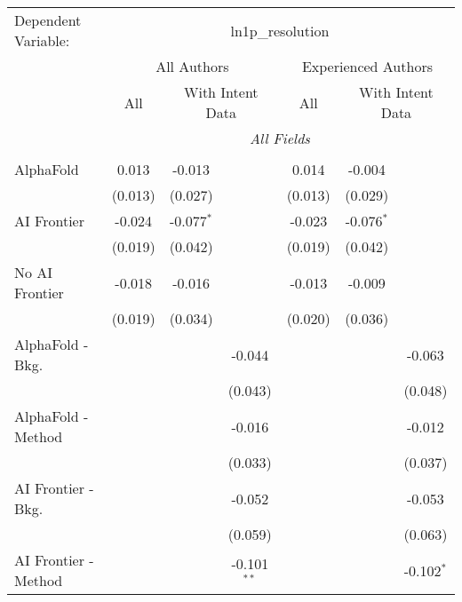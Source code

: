 \begingroup
\centering
\begin{tabular}{lcccccc}
   \tabularnewline \midrule \midrule
   Dependent Variable: & \multicolumn{6}{c}{ln1p\_resolution}\\
 & \multicolumn{3}{c}{All Authors} & \multicolumn{3}{c}{Experienced Authors} \\
\cmidrule(lr){2-4} \cmidrule(lr){5-7}
 & \multicolumn{1}{c}{All} & \multicolumn{2}{c}{With Intent Data} & \multicolumn{1}{c}{All} & \multicolumn{2}{c}{With Intent Data} \\
\cmidrule(lr){2-2} \cmidrule(lr){3-4} \cmidrule(lr){5-5} \cmidrule(lr){6-7}
 & \multicolumn{6}{c}{\textit{All Fields}} \\ \\
   AlphaFold               & 0.013   & -0.013       &               & 0.014   & -0.004       &   \\   
                           & (0.013) & (0.027)      &               & (0.013) & (0.029)      &   \\   
   AI Frontier             & -0.024  & -0.077$^{*}$ &               & -0.023  & -0.076$^{*}$ &   \\   
                           & (0.019) & (0.042)      &               & (0.019) & (0.042)      &   \\   
   No AI Frontier          & -0.018  & -0.016       &               & -0.013  & -0.009       &   \\   
                           & (0.019) & (0.034)      &               & (0.020) & (0.036)      &   \\   
   AlphaFold - Bkg.        &         &              & -0.044        &         &              & -0.063\\   
                           &         &              & (0.043)       &         &              & (0.048)\\   
   AlphaFold - Method      &         &              & -0.016        &         &              & -0.012\\   
                           &         &              & (0.033)       &         &              & (0.037)\\   
   AI Frontier - Bkg.      &         &              & -0.052        &         &              & -0.053\\   
                           &         &              & (0.059)       &         &              & (0.063)\\   
   AI Frontier - Method    &         &              & -0.101$^{**}$ &         &              & -0.102$^{*}$\\   

\end{tabular}
